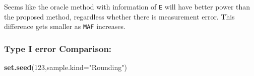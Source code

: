 \documentclass[
]{article}
\newenvironment{Shaded}{\begin{snugshade}}{\end{snugshade}}
\newcommand{\DataTypeTok}[1]{\textcolor[rgb]{0.13,0.29,0.53}{#1}}
\newcommand{\DecValTok}[1]{\textcolor[rgb]{0.00,0.00,0.81}{#1}}
\newcommand{\KeywordTok}[1]{\textcolor[rgb]{0.13,0.29,0.53}{\textbf{#1}}}
\newcommand{\NormalTok}[1]{#1}
\newcommand{\StringTok}[1]{\textcolor[rgb]{0.31,0.60,0.02}{#1}}
\begin{document}
Seems like the oracle method with information of \texttt{E} will have
better power than the proposed method, regardless whether there is
measurement error. This difference gets smaller as \texttt{MAF}
increases.

\clearpage

\hypertarget{type-i-error-comparison}{%
\subsubsection{Type I error Comparison:}\label{type-i-error-comparison}}

\begin{Shaded}
\begin{Highlighting}[]
\KeywordTok{set.seed}\NormalTok{(}\DecValTok{123}\NormalTok{,}\DataTypeTok{sample.kind=}\StringTok{"Rounding"}\NormalTok{)}


\end{Highlighting}
\end{Shaded}
\end{document}
